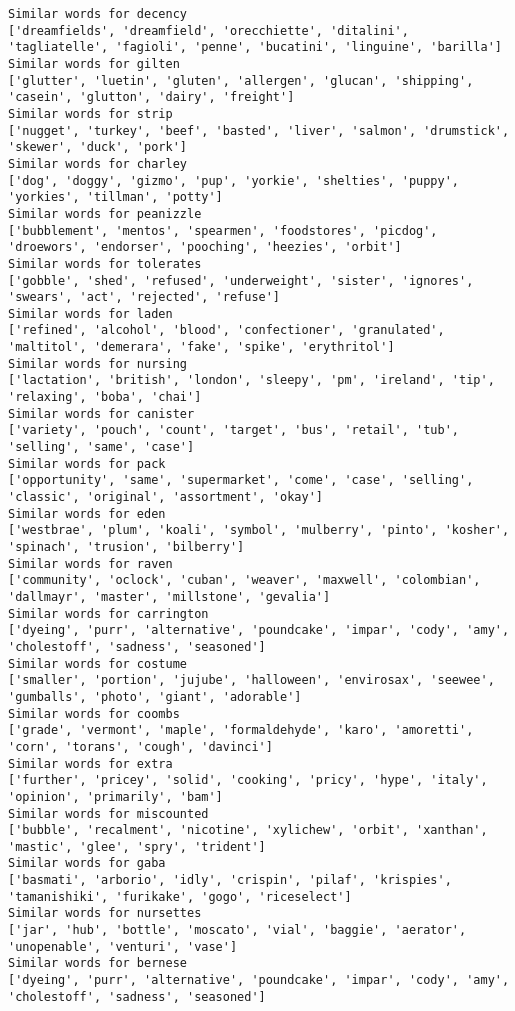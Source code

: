\documentclass[11pt]{article}
\begin{document}
\begin{Verbatim}[commandchars=\\\{\}]
Similar words for decency
['dreamfields', 'dreamfield', 'orecchiette', 'ditalini', 'tagliatelle', 'fagioli', 'penne', 'bucatini', 'linguine', 'barilla']
Similar words for gilten
['glutter', 'luetin', 'gluten', 'allergen', 'glucan', 'shipping', 'casein', 'glutton', 'dairy', 'freight']
Similar words for strip
['nugget', 'turkey', 'beef', 'basted', 'liver', 'salmon', 'drumstick', 'skewer', 'duck', 'pork']
Similar words for charley
['dog', 'doggy', 'gizmo', 'pup', 'yorkie', 'shelties', 'puppy', 'yorkies', 'tillman', 'potty']
Similar words for peanizzle
['bubblement', 'mentos', 'spearmen', 'foodstores', 'picdog', 'droewors', 'endorser', 'pooching', 'heezies', 'orbit']
Similar words for tolerates
['gobble', 'shed', 'refused', 'underweight', 'sister', 'ignores', 'swears', 'act', 'rejected', 'refuse']
Similar words for laden
['refined', 'alcohol', 'blood', 'confectioner', 'granulated', 'maltitol', 'demerara', 'fake', 'spike', 'erythritol']
Similar words for nursing
['lactation', 'british', 'london', 'sleepy', 'pm', 'ireland', 'tip', 'relaxing', 'boba', 'chai']
Similar words for canister
['variety', 'pouch', 'count', 'target', 'bus', 'retail', 'tub', 'selling', 'same', 'case']
Similar words for pack
['opportunity', 'same', 'supermarket', 'come', 'case', 'selling', 'classic', 'original', 'assortment', 'okay']
Similar words for eden
['westbrae', 'plum', 'koali', 'symbol', 'mulberry', 'pinto', 'kosher', 'spinach', 'trusion', 'bilberry']
Similar words for raven
['community', 'oclock', 'cuban', 'weaver', 'maxwell', 'colombian', 'dallmayr', 'master', 'millstone', 'gevalia']
Similar words for carrington
['dyeing', 'purr', 'alternative', 'poundcake', 'impar', 'cody', 'amy', 'cholestoff', 'sadness', 'seasoned']
Similar words for costume
['smaller', 'portion', 'jujube', 'halloween', 'envirosax', 'seewee', 'gumballs', 'photo', 'giant', 'adorable']
Similar words for coombs
['grade', 'vermont', 'maple', 'formaldehyde', 'karo', 'amoretti', 'corn', 'torans', 'cough', 'davinci']
Similar words for extra
['further', 'pricey', 'solid', 'cooking', 'pricy', 'hype', 'italy', 'opinion', 'primarily', 'bam']
Similar words for miscounted
['bubble', 'recalment', 'nicotine', 'xylichew', 'orbit', 'xanthan', 'mastic', 'glee', 'spry', 'trident']
Similar words for gaba
['basmati', 'arborio', 'idly', 'crispin', 'pilaf', 'krispies', 'tamanishiki', 'furikake', 'gogo', 'riceselect']
Similar words for nursettes
['jar', 'hub', 'bottle', 'moscato', 'vial', 'baggie', 'aerator', 'unopenable', 'venturi', 'vase']
Similar words for bernese
['dyeing', 'purr', 'alternative', 'poundcake', 'impar', 'cody', 'amy', 'cholestoff', 'sadness', 'seasoned']

\end{Verbatim}
\end{document}
